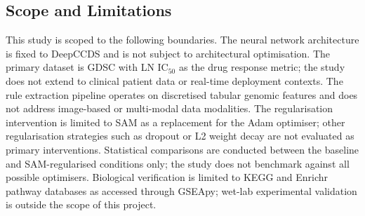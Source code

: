 \subsection*{Scope and Limitations}

This study is scoped to the following boundaries. The neural network architecture is fixed to
DeepCCDS \cite{Wu2025} and is not subject to architectural optimisation. The primary dataset is
GDSC with LN IC$_{50}$ as the drug response metric; the study does not extend to
clinical patient data or real-time deployment contexts. The rule extraction pipeline operates on
discretised tabular genomic features and does not address image-based or multi-modal data
modalities. The regularisation intervention is limited to SAM as a replacement for the Adam
optimiser; other regularisation strategies such as dropout or L2 weight decay are not evaluated as
primary interventions. Statistical comparisons are conducted between the baseline and
SAM-regularised conditions only; the study does not benchmark against all possible optimisers.
Biological verification is limited to KEGG and Enrichr pathway databases as accessed through
GSEApy; wet-lab experimental validation is outside the scope of this project.